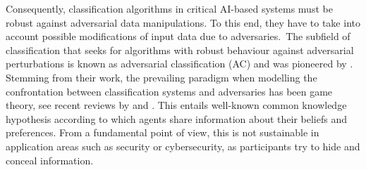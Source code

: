 Consequently, classification algorithms in critical AI-based systems must be robust against adversarial data manipulations. To this end, they have to take into account possible modifications of input data
due to adversaries.~The subfield of
classification that seeks for algorithms with robust behaviour against adversarial perturbations is known as adversarial classification (AC)
and  was pioneered by \parencite{adversarialClassification2004}.
Stemming from their work, the prevailing paradigm 
when modelling the confrontation between classification systems and adversaries has been game theory, see recent reviews by \parencite{BIGGIO2018317} and \parencite{doi:10.1002/widm.1259}. This entails well-known common knowledge hypothesis \parencite{Antos,gameTheoryACriticalIntroduction2004} according to which agents share information about their beliefs and preferences. From a fundamental point of view, this is 
not sustainable in  application areas such as security or cybersecurity,
as participants try to
hide and conceal information.  

